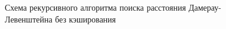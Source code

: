 \begin{figure}[h!]
	
		
	\caption{Схема рекурсивного алгоритма поиска расстояния Дамерау-Левенштейна без кэширования}
		
	\label{fig:dl_recursive}
		
\end{figure}

